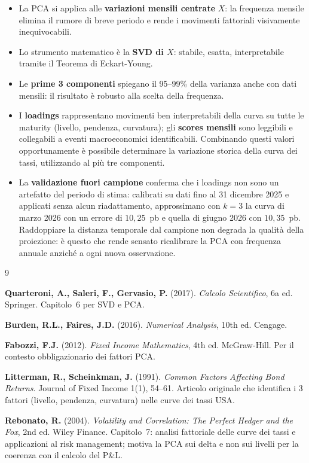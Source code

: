 \documentclass[11pt,a4paper]{article}
\theoremstyle{plain}
\theoremstyle{definition}
\theoremstyle{remark}
\begin{document}
\begin{itemize}
  \item La PCA si applica alle \textbf{variazioni mensili centrate} $X$: la
        frequenza mensile elimina il rumore di breve periodo e rende i
        movimenti fattoriali visivamente inequivocabili.
  \item Lo strumento matematico è la \textbf{SVD di $X$}: stabile, esatta,
        interpretabile tramite il Teorema di Eckart-Young.
  \item Le \textbf{prime 3 componenti} spiegano il 95--99\% della varianza
        anche con dati mensili: il risultato è robusto alla scelta della
        frequenza.
  \item I \textbf{loadings} rappresentano movimenti ben interpretabili della curva su tutte le maturity (livello, pendenza, curvatura); gli \textbf{scores mensili} sono leggibili e
        collegabili a eventi macroeconomici identificabili. Combinando questi valori opportunamente è possibile determinare la variazione storica della curva dei tassi, utilizzando al più tre componenti.
  \item La \textbf{validazione fuori campione} conferma che i loadings non
        sono un artefatto del periodo di stima: calibrati su dati fino al
        31 dicembre 2025 e applicati senza alcun riadattamento, approssimano
        con $k=3$ la curva di marzo 2026 con un errore di $10{,}25$~pb e
        quella di giugno 2026 con $10{,}35$~pb. Raddoppiare la distanza
        temporale dal campione non degrada la qualità della proiezione: è
        questo che rende sensato ricalibrare la PCA con frequenza annuale
        anziché a ogni nuova osservazione.
\end{itemize}

\renewcommand{\refname}{Riferimenti bibliografici}
\begin{thebibliography}{9}

  \textbf{Quarteroni, A., Saleri, F., Gervasio, P.} (2017).
  \textit{Calcolo Scientifico}, 6a ed. Springer.
  Capitolo~6 per SVD e PCA.

  \textbf{Burden, R.L., Faires, J.D.} (2016).
  \textit{Numerical Analysis}, 10th ed. Cengage.

  \textbf{Fabozzi, F.J.} (2012).
  \textit{Fixed Income Mathematics}, 4th ed. McGraw-Hill.
  Per il contesto obbligazionario dei fattori PCA.

  \textbf{Litterman, R., Scheinkman, J.} (1991).
  \textit{Common Factors Affecting Bond Returns}.
  Journal of Fixed Income 1(1), 54--61.
  Articolo originale che identifica i 3 fattori (livello, pendenza, curvatura)
  nelle curve dei tassi USA.

  \textbf{Rebonato, R.} (2004).
  \textit{Volatility and Correlation: The Perfect Hedger and the Fox},
  2nd ed. Wiley Finance.
  Capitolo~7: analisi fattoriale delle curve dei tassi e applicazioni al
  risk management; motiva la PCA sui delta e non sui livelli per la
  coerenza con il calcolo del P\&L.

\end{thebibliography}
\end{document}
